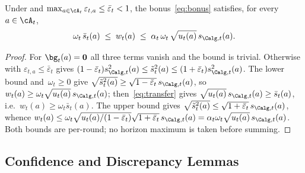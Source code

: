 \begin{lemma}\label{lem:bonus}
Under  and $\max_{a\in\cA_t}\varepsilon_{t,a}\le\bar\varepsilon_t<1$,
the bonus~\eqref{eq:bonus} satisfies, for every $a\in\cA_t$,
\begin{equation}\label{eq:bonus-sandwich}
  \omega_t\,\bar s_t(a)
  \;\le\;
  w_t(a)
  \;\le\;
  \alpha_t\,\omega_t\,\sqrt{u_t(a)}\,s_{\Calg,t}(a).
\end{equation}
\end{lemma}
\begin{proof}
For $\bg_t(a)=\mathbf0$ all three terms vanish and the bound is trivial.
Otherwise  with $\varepsilon_{t,a}\le\bar\varepsilon_t$ gives
$(1-\bar\varepsilon_t)s_{\Calg,t}^2(a)\le\tilde s_t^2(a)\le
(1+\bar\varepsilon_t)s_{\Calg,t}^2(a)$.  The lower bound and~$\omega_t\ge0$
give $\sqrt{\tilde s_t^2(a)}\ge\sqrt{1-\bar\varepsilon_t}\,s_{\Calg,t}(a)$,
so $w_t(a)\ge\omega_t\sqrt{u_t(a)}\,s_{\Calg,t}(a)$; then~\eqref{eq:transfer}
gives $\sqrt{u_t(a)}\,s_{\Calg,t}(a)\ge\bar s_t(a)$, i.e.\
$w_t(a)\ge\omega_t\bar s_t(a)$.  The upper bound gives
$\sqrt{\tilde s_t^2(a)}\le\sqrt{1+\bar\varepsilon_t}\,s_{\Calg,t}(a)$, whence
$w_t(a)\le\omega_t\sqrt{u_t(a)/(1-\bar\varepsilon_t)}\sqrt{1+\bar\varepsilon_t}\,
s_{\Calg,t}(a)=\alpha_t\omega_t\sqrt{u_t(a)}\,s_{\Calg,t}(a)$.
Both bounds are per-round; no horizon maximum is taken before summing.
\end{proof}



\subsection{Confidence and Discrepancy Lemmas}

